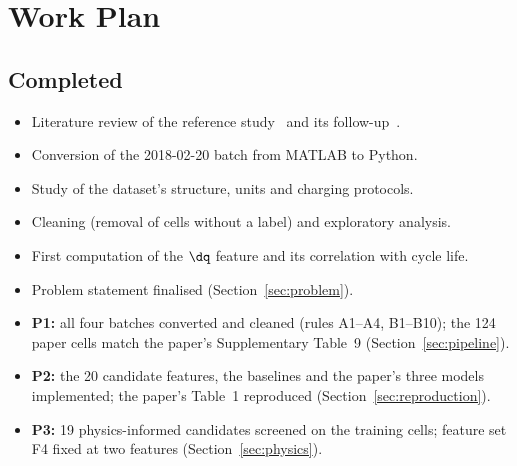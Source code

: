 \section{Work Plan}
\label{sec:plan}

\subsection{Completed}
\begin{itemize}
  \item Literature review of the reference study~\cite{severson2019} and its
  follow-up~\cite{attia2020}.
  \item Conversion of the 2018-02-20 batch from MATLAB to Python.
  \item Study of the dataset's structure, units and charging protocols.
  \item Cleaning (removal of cells without a label) and exploratory
  analysis.
  \item First computation of the $\dq$ feature and its correlation with
  cycle life.
  \item Problem statement finalised (Section~\ref{sec:problem}).
  \item \textbf{P1:} all four batches converted and cleaned (rules A1--A4,
  B1--B10); the 124 paper cells match the paper's Supplementary Table~9
  (Section~\ref{sec:pipeline}).
  \item \textbf{P2:} the 20 candidate features, the baselines and the
  paper's three models implemented; the paper's Table~1 reproduced
  (Section~\ref{sec:reproduction}).
  \item \textbf{P3:} 19 physics-informed candidates screened on the
  training cells; feature set F4 fixed at two features
  (Section~\ref{sec:physics}).
\end{itemize}

